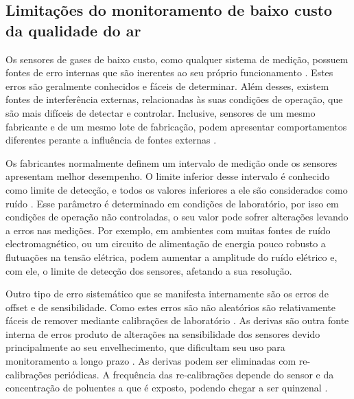 \subsection{Limitações do monitoramento de baixo custo da qualidade do ar}\label{subsection:low-cost-monit-limits}

Os sensores de gases de baixo custo, como qualquer sistema de medição, possuem fontes de erro internas que são inerentes ao seu próprio funcionamento \cite{Maag2018ADeployments}. Estes erros são geralmente conhecidos e fáceis de determinar. Além desses, existem fontes de interferência externas, relacionadas às suas condições de operação, que são mais difíceis de detectar e controlar. Inclusive, sensores de um mesmo fabricante e de um mesmo lote de fabricação, podem apresentar comportamentos diferentes perante a influência de fontes externas \cite{Alphasense2013AlphasenseHUMIDITY,Castell2017CanEstimates}.

Os fabricantes normalmente definem um intervalo de medição onde os sensores apresentam melhor desempenho. O limite inferior desse intervalo é conhecido como limite de detecção, e todos os valores inferiores a ele são considerados como ruído \cite{Maag2018ADeployments}. Esse parâmetro é determinado em condições de laboratório, por isso em condições de operação não controladas, o seu valor pode sofrer alterações levando a erros nas medições. Por exemplo, em ambientes com muitas fontes de ruído electromagnético, ou um circuito de alimentação de energia pouco robusto a flutuações na tensão elétrica, podem aumentar a amplitude do ruído elétrico e, com ele, o limite de detecção dos sensores, afetando a sua resolução.

Outro tipo de erro sistemático que se manifesta internamente são os erros de offset e de sensibilidade. Como estes erros são não aleatórios são relativamente fáceis de remover mediante calibrações de laboratório \cite{Spinelle2013ProtocolPollution}. As derivas são outra fonte interna de erros produto de alterações na sensibilidade dos sensores devido principalmente ao seu envelhecimento, que dificultam seu uso para monitoramento a longo prazo \cite{Feng2019ReviewTechnology}. As derivas podem ser eliminadas com re-calibrações periódicas. A frequência das re-calibrações depende do sensor e da concentração de poluentes a que é exposto, podendo chegar a ser quinzenal \cite{Concas2021LOW-COSTPREPRINT}.

